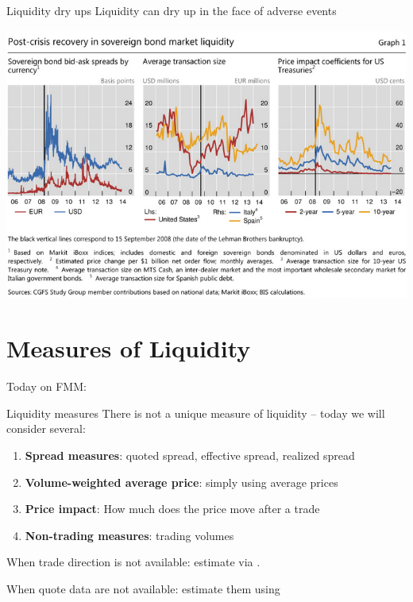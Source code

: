 \documentclass[english,10pt]{beamer}
\begin{document}
\begin{frame}{Liquidity dry ups}
	Liquidity can dry up in the face of adverse events
	\begin{center}
		\includegraphics[scale=0.4]{pics/L2_liquiditylehman}
	\end{center}
\end{frame}



\section{Measures of Liquidity}

\begin{frame}{Today on FMM:}
	\tableofcontents[currentsection]
\end{frame}


\begin{frame}{Liquidity measures}
There is not a unique measure of liquidity -- today we will consider several:
\begin{enumerate}
	\item \textbf{Spread measures}: quoted spread, effective spread, realized spread
	\item \textbf{Volume-weighted average price}: simply using average prices
	\item \textbf{Price impact}: How much does the price move after a trade
	\item \textbf{Non-trading measures}: trading volumes
\end{enumerate}

When trade direction is not available: estimate via . 

When quote data are not available: estimate them using 
\end{frame}
\end{document}
